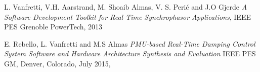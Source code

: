\documentclass[conference]{IEEEtran}
\begin{document}
\begin{thebibliography}{1}


 L. Vanfretti, V.H. Aarstrand, M. Shoaib Almas, V. S. Peri\'c and J.O Gjerde \emph{A Software Development Toolkit for Real-Time Synchrophasor Applications},  IEEE PES Grenoble PowerTech, 2013

 E. Rebello, L. Vanfretti and M.S Almas \emph{PMU-based Real-Time Damping Control System Software and Hardware Architecture Synthesis and Evaluation} IEEE PES GM, Denver, Colorado, July 2015,



\end{thebibliography}
\end{document}
